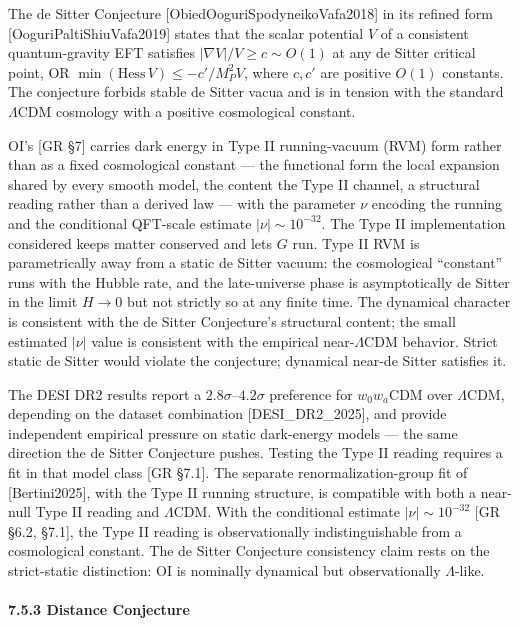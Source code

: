 \documentclass[
]{article}
\begin{document}
The de Sitter Conjecture {[}ObiedOoguriSpodyneikoVafa2018{]} in its
refined form {[}OoguriPaltiShiuVafa2019{]} states that the scalar
potential \(V\) of a consistent quantum-gravity EFT satisfies
\(|\nabla V|/V \geq c \sim O(1)\) at any de Sitter critical point, OR
\(\min(\text{Hess}\,V) \leq -c'/M_P^2 V\), where \(c, c'\) are positive
\(O(1)\) constants. The conjecture forbids stable de Sitter vacua and is
in tension with the standard \(\Lambda\)CDM cosmology with a positive
cosmological constant.

OI's {[}GR §7{]} carries dark energy in Type II running-vacuum (RVM)
form rather than as a fixed cosmological constant --- the functional
form the local expansion shared by every smooth model, the content the
Type II channel, a structural reading rather than a derived law --- with
the parameter \(\nu\) encoding the running and the conditional QFT-scale
estimate \(\lvert\nu\rvert\sim10^{-32}\). The Type II implementation
considered keeps matter conserved and lets \(G\) run. Type II RVM is
parametrically away from a static de Sitter vacuum: the cosmological
``constant'' runs with the Hubble rate, and the late-universe phase is
asymptotically de Sitter in the limit \(H \to 0\) but not strictly so at
any finite time. The dynamical character is consistent with the de
Sitter Conjecture's structural content; the small estimated \(|\nu|\)
value is consistent with the empirical near-\(\Lambda\)CDM behavior.
Strict static de Sitter would violate the conjecture; dynamical near-de
Sitter satisfies it.

The DESI DR2 results report a \(2.8\sigma\)--\(4.2\sigma\) preference
for \(w_0w_a\)CDM over \(\Lambda\)CDM, depending on the dataset
combination {[}DESI\_DR2\_2025{]}, and provide independent empirical
pressure on static dark-energy models --- the same direction the de
Sitter Conjecture pushes. Testing the Type II reading requires a fit in
that model class {[}GR §7.1{]}. The separate renormalization-group fit
of {[}Bertini2025{]}, with the Type II running structure, is compatible
with both a near-null Type II reading and \(\Lambda\)CDM. With the
conditional estimate \(|\nu| \sim 10^{-32}\) {[}GR §6.2, §7.1{]}, the
Type II reading is observationally indistinguishable from a cosmological
constant. The de Sitter Conjecture consistency claim rests on the
strict-static distinction: OI is nominally dynamical but observationally
\(\Lambda\)-like.

\hypertarget{distance-conjecture}{%
\paragraph{7.5.3 Distance Conjecture}\label{distance-conjecture}}
\end{document}
